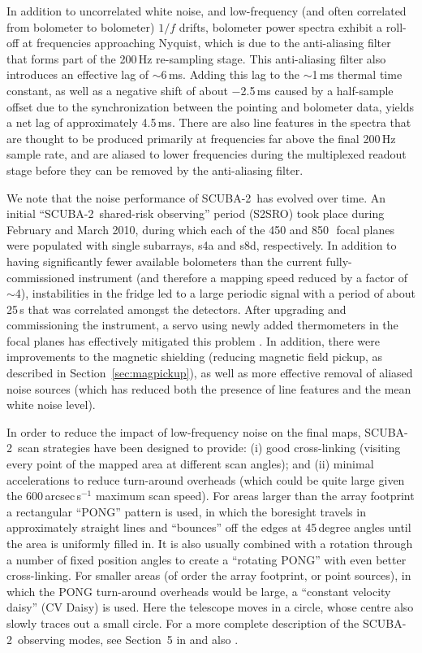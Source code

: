 \documentclass[useAMS,usenatbib,nofootinbib]{mn2e}
\newcommand{\scuba}{SCUBA-2}
\begin{document}
In addition to uncorrelated white noise, and low-frequency (and often
correlated from bolometer to bolometer) $1/f$ drifts, bolometer power
spectra exhibit a roll-off at frequencies approaching Nyquist, which
is due to the anti-aliasing filter that forms part of the 200\,Hz
re-sampling stage. This anti-aliasing filter also introduces an
effective lag of $\sim$6\,ms. Adding this lag to the $\sim$1\,ms
thermal time constant, as well as a negative shift of about $-$2.5\,ms
caused by a half-sample offset due to the synchronization between the
pointing and bolometer data, yields a net lag of approximately
4.5\,ms. There are also line features in the spectra that are thought
to be produced primarily at frequencies far above the final 200\,Hz
sample rate, and are aliased to lower frequencies during the
multiplexed readout stage before they can be removed by the
anti-aliasing filter.

We note that the noise performance of \scuba\ has evolved over
time. An initial ``\scuba\ shared-risk observing'' period (S2SRO) took
place during February and March 2010, during which each of the 450 and
850\,\micron\ focal planes were populated with single subarrays, s4a
and s8d, respectively. In addition to having significantly fewer
available bolometers than the current fully-commissioned instrument
(and therefore a mapping speed reduced by a factor of $\sim$4),
instabilities in the fridge led to a large periodic signal with a
period of about 25\,s that was correlated amongst the detectors. After
upgrading and commissioning the instrument, a servo using newly added
thermometers in the focal planes has effectively mitigated this
problem \citep[Section~2.5 in][]{holland2012}. In addition, there were
improvements to the magnetic shielding (reducing magnetic field
pickup, as described in Section~\ref{sec:magpickup}), as well as more
effective removal of aliased noise sources (which has reduced both the
presence of line features and the mean white noise level).

In order to reduce the impact of low-frequency noise on the final
maps, \scuba\ scan strategies have been designed to provide: (i) good
cross-linking (visiting every point of the mapped area at different
scan angles); and (ii) minimal accelerations to reduce turn-around
overheads (which could be quite large given the 600\,arcsec\,s$^{-1}$
maximum scan speed). For areas larger than the array footprint a
rectangular ``PONG'' pattern is used, in which the boresight travels
in approximately straight lines and ``bounces'' off the edges at
45\,degree angles until the area is uniformly filled in. It is also
usually combined with a rotation through a number of fixed position
angles to create a ``rotating PONG'' with even better
cross-linking. For smaller areas (of order the array footprint, or
point sources), in which the PONG turn-around overheads would be
large, a ``constant velocity daisy'' (CV Daisy) is used.  Here the
telescope moves in a circle, whose centre also slowly traces out a
small circle. For a more complete description of the \scuba\ observing
modes, see Section~5 in \citet{holland2012} and also
\citet{2010SPIE.7740E..66K}.
\end{document}

